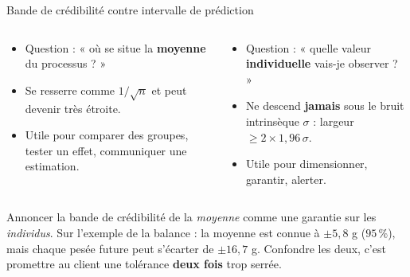 \begin{frame}{Bande de crédibilité contre intervalle de prédiction}
\begin{columns}[t]
\begin{column}{0.49\textwidth}
\begin{tcolorbox}[enhanced,colback=byBlue!6,colframe=byBlue,arc=2mm,
   title={\bfseries\color{white} Bande de crédibilité de $\mu(x)$},colbacktitle=byBlue,
   attach boxed title to top left={xshift=3mm,yshift=-2mm},
   boxed title style={arc=1mm,boxrule=0pt}]
\begin{itemize}
  \item Question : « où se situe la \textbf{moyenne} du processus ? »
  \item Se resserre comme $1/\sqrt n$ et peut devenir très étroite.
  \item Utile pour comparer des groupes, tester un effet, communiquer une
        estimation.
\end{itemize}
\end{tcolorbox}
\end{column}
\begin{column}{0.49\textwidth}
\begin{tcolorbox}[enhanced,colback=byPurple!7,colframe=byPurple,arc=2mm,
   title={\bfseries\color{white} Intervalle de prédiction de $\tilde y$},colbacktitle=byPurple,
   attach boxed title to top left={xshift=3mm,yshift=-2mm},
   boxed title style={arc=1mm,boxrule=0pt}]
\begin{itemize}
  \item Question : « quelle valeur \textbf{individuelle} vais-je observer ? »
  \item Ne descend \textbf{jamais} sous le bruit intrinsèque $\sigma$ :
        largeur $\geq 2 \times 1{,}96\,\sigma$.
  \item Utile pour dimensionner, garantir, alerter.
\end{itemize}
\end{tcolorbox}
\end{column}
\end{columns}
\vspace{1mm}
\begin{wbox}
\small Annoncer la bande de crédibilité de la \emph{moyenne} comme une garantie sur
les \emph{individus}. Sur l'exemple de la balance : la moyenne est connue à
$\pm 5{,}8$ g ($95\,\%$), mais chaque pesée future peut s'écarter de $\pm 16{,}7$ g.
Confondre les deux, c'est promettre au client une tolérance
\textbf{deux fois} trop serrée.
\end{wbox}
\end{frame}

